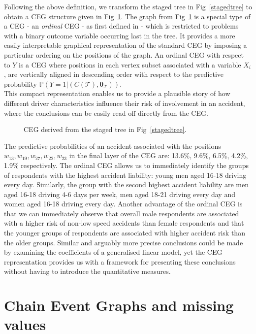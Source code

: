 \documentclass[runningheads]{llncs}
\begin{document}
Following the above definition, we transform the staged tree in Fig~\ref{stagedtree} to obtain a CEG structure given in Fig~\ref{ceg:freq-acc}. The graph from Fig~\ref{ceg:freq-acc} is a special type of a CEG - an \emph{ordinal} CEG -  as first defined in \cite{barclay2014missingness} - which is restricted to problems with a binary outcome variable occurring last in the tree. It provides a more easily interpretable graphical representation of the standard CEG by imposing a particular ordering on the positions of the graph. An ordinal CEG with respect to $Y$ is a CEG where positions in each vertex subset associated with a variable $X_i$, are vertically aligned in descending order with respect to the predictive probability $\mathbb{P}(Y = 1|(C(\mathcal{T}) , \boldsymbol{\theta}_{\mathcal{T}}))$. \\
This compact representation enables us to provide a plausible story of how different driver characteristics influence their risk of involvement in an accident, where the conclusions can be easily read off directly from the CEG.
\begin{figure}
\centering

\caption{CEG derived from the staged tree in Fig~\ref{stagedtree}.}
\label{ceg:freq-acc}
\vspace{3ex}
\end{figure}
The predictive probabilities of an accident associated with the positions $w_{13}, w_{19}, w_{27}, w_{22}, w_{23}$ in the final layer of the CEG are: 13.6\%, 9.6\%, 6.5\%, 4.2\%, 1.9\% respectively.
The ordinal CEG allows us to immediately identify the groups of respondents with the highest accident liability: young men aged 16-18 driving every day. Similarly, the group with the second highest accident liability are men aged 16-18 driving 4-6 days per week, men aged 18-21 driving every day and women aged 16-18 driving every day. Another advantage of the ordinal CEG is that we can immediately observe that overall male respondents are associated with a higher risk of non-low speed accidents than female respondents and that the younger groups of respondents are associated with higher accident risk than the older groups. Similar and arguably more precise conclusions could be made by examining the coefficients of a generalised linear model, yet the CEG representation provides us with a framework for presenting these conclusions without having to introduce the quantitative measures. 

\section{Chain Event Graphs and missing values}\label{sec:missing}
\end{document}
